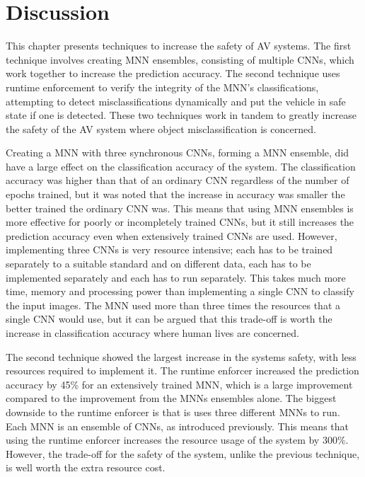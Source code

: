 \section{Discussion}
This chapter presents techniques to increase the safety of \ac{AV} systems. 
The first technique involves creating \ac{MNN} ensembles, consisting of multiple \acp{CNN}, which work together to increase the prediction accuracy.
The second technique uses runtime enforcement to verify the integrity of the \ac{MNN}'s classifications, attempting to detect misclassifications dynamically and put the vehicle in safe state if one is detected.
These two techniques work in tandem to greatly increase the safety of the \ac{AV} system where object misclassification is concerned.

Creating a \ac{MNN}  with three synchronous \acp{CNN}, forming a \ac{MNN} ensemble, did have a large effect on the classification accuracy of the system.
The classification accuracy was higher than that of an ordinary \ac{CNN} regardless of the number of epochs trained, but it was noted that the increase in accuracy was smaller the better trained the ordinary \ac{CNN} was.
This means that using \ac{MNN} ensembles is more effective for poorly or incompletely trained \acp{CNN}, but it still increases the prediction accuracy even when extensively trained \acp{CNN} are used.
However, implementing three \acp{CNN} is very resource intensive; each has to be trained separately to a suitable standard and on different data, each has to be implemented separately and each has to run separately.
This takes much more time, memory and processing power than implementing a single \ac{CNN} to classify the input images.
The \ac{MNN} used more than three times the resources that a single \ac{CNN} would use, but it can be argued that this trade-off is worth the increase in classification accuracy where human lives are concerned.

The second technique showed the largest increase in the systems safety, with less resources required to implement it.
The runtime enforcer increased the prediction accuracy by 45\% for an extensively trained \ac{MNN}, which is a large improvement compared to the improvement from the \acp{MNN} ensembles alone. 
The biggest downside to the runtime enforcer is that is uses three different \acp{MNN} to run.
Each \ac{MNN} is an ensemble of \acp{CNN}, as introduced previously.
This means that using the runtime enforcer increases the resource usage of the system by 300\%.
However, the trade-off for the safety of the system, unlike the previous technique, is well worth the extra resource cost.

